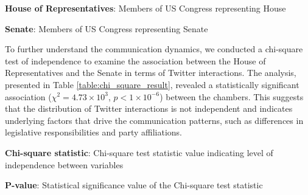 \documentclass[11pt]{article}
\begin{document}
\begin{table}[h]
\caption{Distribution of interactions among House of Representatives and Senate Members}
\label{table:distribution_of_interactions}
\begin{threeparttable}
\renewcommand{\TPTminimum}{\linewidth}
\begin{tablenotes}
\footnotesize
\item \textbf{House of Representatives}: Members of US Congress representing House
\item \textbf{Senate}: Members of US Congress representing Senate
\end{tablenotes}
\end{threeparttable}
\end{table}


To further understand the communication dynamics, we conducted a chi-square test of independence to examine the association between the House of Representatives and the Senate in terms of Twitter interactions. The analysis, presented in Table \ref{table:chi_square_result}, revealed a statistically significant association (\(\chi^2 = 4.73 \times 10^3\), \(p < 1 \times 10^{-6}\)) between the chambers. This suggests that the distribution of Twitter interactions is not independent and indicates underlying factors that drive the communication patterns, such as differences in legislative responsibilities and party affiliations.

\begin{table}[h]
\caption{Chi-square Test of Independence Result}
\label{table:chi_square_result}
\begin{threeparttable}
\renewcommand{\TPTminimum}{\linewidth}
\begin{tablenotes}
\footnotesize
\item \textbf{Chi-square statistic}: Chi-square test statistic value indicating level of independence between variables
\item \textbf{P-value}: Statistical significance value of the Chi-square test statistic
\end{tablenotes}
\end{threeparttable}
\end{table}
\end{document}
